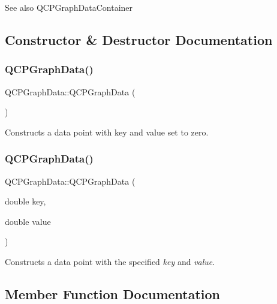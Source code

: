 \begin{DoxySeeAlso}{See also}
Q\+C\+P\+Graph\+Data\+Container 
\end{DoxySeeAlso}


\subsection{Constructor \& Destructor Documentation}
\mbox{\label{class_q_c_p_graph_data_ac43f7499383d2fa2ffb7a4ad43f76c7c}} 
\subsubsection{\texorpdfstring{Q\+C\+P\+Graph\+Data()}{QCPGraphData()}\hspace{0.1cm}{\footnotesize\ttfamily [1/2]}}
{\footnotesize\ttfamily Q\+C\+P\+Graph\+Data\+::\+Q\+C\+P\+Graph\+Data (\begin{DoxyParamCaption}{ }\end{DoxyParamCaption})}

Constructs a data point with key and value set to zero. \mbox{\label{class_q_c_p_graph_data_a2c32177f12f902f4e05f712837082bd6}} 
\subsubsection{\texorpdfstring{Q\+C\+P\+Graph\+Data()}{QCPGraphData()}\hspace{0.1cm}{\footnotesize\ttfamily [2/2]}}
{\footnotesize\ttfamily Q\+C\+P\+Graph\+Data\+::\+Q\+C\+P\+Graph\+Data (\begin{DoxyParamCaption}\item[{double}]{key,  }\item[{double}]{value }\end{DoxyParamCaption})}

Constructs a data point with the specified {\itshape key} and {\itshape value}. 

\subsection{Member Function Documentation}
\mbox{\label{class_q_c_p_graph_data_a4646eac7f7a48970ea0fc5153aab0e77}} 

